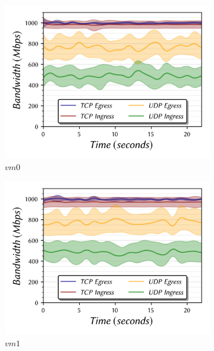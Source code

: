 \documentclass[a4paper,10pt]{article}
\begin{document}
\begin{figure}
\centering
\begin{subfigure}{.33\textwidth}
  \centering
  \includegraphics[width=\hsize]{figs/cluster1/setA/vis-5-vm0-combined.png}
  \caption{$vm0$}
  \label{fig:bw-bidir-1:a}
\end{subfigure}%
\hfill%
\begin{subfigure}{.33\textwidth}
  \centering
  \includegraphics[width=\hsize]{figs/cluster1/setA/vis-5-vm1-combined.png}
  \caption{$vm1$}
  \label{fig:bw-bidir-1:b}
\end{subfigure}%
\hfill%
\begin{subfigure}{.33\textwidth}
  \centering

\end{subfigure}
\end{figure}
\end{document}
